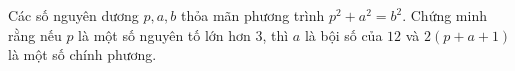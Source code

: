 \ifshowproblem
\begin{problem}\label{example:GBR-2015-MO1-P2}
    Các số nguyên dương \( p, a, b \) thỏa mãn phương trình \( p^2 + a^2 = b^2 \).  
    Chứng minh rằng nếu \( p \) là một số nguyên tố lớn hơn \( 3 \),
    thì \( a \) là bội số của \( 12 \) và \( 2(p + a + 1) \) là một số chính phương.
\end{problem}
\fi

\fi